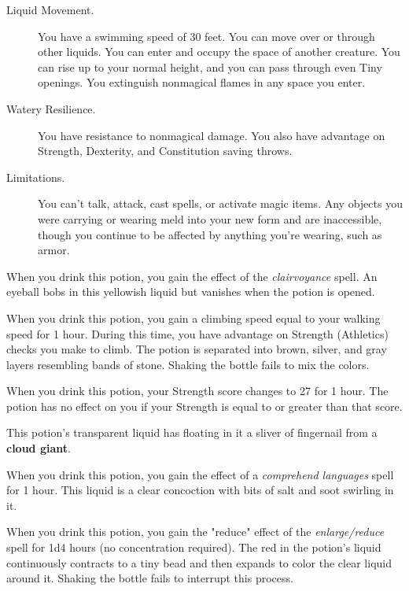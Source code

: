 \documentclass[10pt,a4paper,twoside,bg=print,twocolumn,openany,nodeprecatedcode]{dndbook}
\begin{document}
\begin{description}
\item[Liquid Movement.]
You have a swimming speed of 30 feet. You can move over or through other liquids. You can enter and occupy the space of another creature. You can rise up to your normal height, and you can pass through even Tiny openings. You extinguish nonmagical flames in any space you enter.
\item[Watery Resilience.]
You have resistance to nonmagical damage. You also have advantage on Strength, Dexterity, and Constitution saving throws.
\item[Limitations.]
You can't talk, attack, cast spells, or activate magic items. Any objects you were carrying or wearing meld into your new form and are inaccessible, though you continue to be affected by anything you're wearing, such as armor.
\end{description}

When you drink this potion, you gain the effect of the \textit{clairvoyance} spell. An eyeball bobs in this yellowish liquid but vanishes when the potion is opened.

When you drink this potion, you gain a climbing speed equal to your walking speed for 1 hour. During this time, you have advantage on Strength (Athletics) checks you make to climb. The potion is separated into brown, silver, and gray layers resembling bands of stone. Shaking the bottle fails to mix the colors.

When you drink this potion, your Strength score changes to 27 for 1 hour. The potion has no effect on you if your Strength is equal to or greater than that score.

This potion's transparent liquid has floating in it a sliver of fingernail from a \textbf{cloud giant}.

When you drink this potion, you gain the effect of a \textit{comprehend languages} spell for 1 hour. This liquid is a clear concoction with bits of salt and soot swirling in it.

When you drink this potion, you gain the "reduce" effect of the \textit{enlarge/reduce} spell for 1d4 hours (no concentration required). The red in the potion's liquid continuously contracts to a tiny bead and then expands to color the clear liquid around it. Shaking the bottle fails to interrupt this process.
\end{document}
